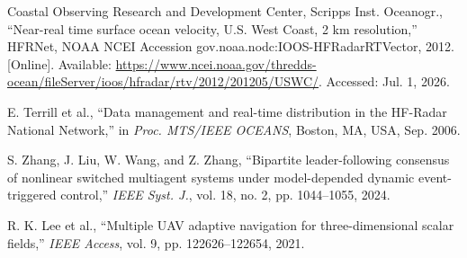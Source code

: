  Coastal Observing Research and Development Center, Scripps Inst. Oceanogr., ``Near-real time surface ocean velocity, U.S. West Coast, 2 km resolution,'' HFRNet, NOAA NCEI Accession gov.noaa.nodc:IOOS-HFRadarRTVector, 2012. [Online]. Available: \url{https://www.ncei.noaa.gov/thredds-ocean/fileServer/ioos/hfradar/rtv/2012/201205/USWC/}. Accessed: Jul. 1, 2026.

 E. Terrill et al., ``Data management and real-time distribution in the HF-Radar National Network,'' in \textit{Proc. MTS/IEEE OCEANS}, Boston, MA, USA, Sep. 2006.

 S. Zhang, J. Liu, W. Wang, and Z. Zhang, ``Bipartite leader-following consensus of nonlinear switched multiagent systems under model-depended dynamic event-triggered control,'' \textit{IEEE Syst. J.}, vol. 18, no. 2, pp. 1044--1055, 2024.

 R. K. Lee et al., ``Multiple UAV adaptive navigation for three-dimensional scalar fields,'' \textit{IEEE Access}, vol. 9, pp. 122626--122654, 2021.
